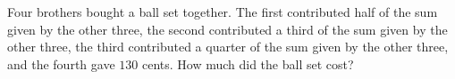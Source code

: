 Four brothers bought a ball set together. The first contributed half of the sum given by the other three, the second contributed a third of the sum given by the other three, the third contributed a quarter of the sum given by the other three, and the fourth gave $130$ cents. How much did the ball set cost?
